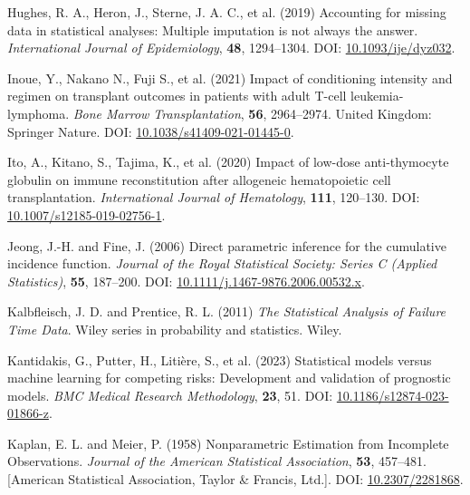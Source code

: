 \documentclass[
  letterpaper,
  paper=240mm:170mm,
  twoside=true,
  open=right,
  fontsize=10pt,
  pagesize=false,
  BCOR=15mm,
  DIV=14,
  headinclude=true,
  footinclude=false,
  headsepline=on]{scrbook}
\newlength{\cslhangindent}
\newenvironment{CSLReferences}[2] %
 {\begin{list}{}{%
  \setlength{\itemindent}{0pt}
  \setlength{\leftmargin}{0pt}
  \setlength{\parsep}{0pt}
  \ifodd #1
   \setlength{\leftmargin}{\cslhangindent}
   \setlength{\itemindent}{-1\cslhangindent}
  \fi
  \setlength{\itemsep}{#2\baselineskip}}}
 {\end{list}}
\begin{document}
\begin{CSLReferences}{1}{1}
Hughes, R. A., Heron, J., Sterne, J. A. C., et al. (2019) Accounting for
missing data in statistical analyses: Multiple imputation is not always
the answer. \emph{International Journal of Epidemiology}, \textbf{48},
1294--1304. DOI:
\href{https://doi.org/10.1093/ije/dyz032}{10.1093/ije/dyz032}.

Inoue, Y., Nakano N., Fuji S., et al. (2021) Impact of conditioning
intensity and regimen on transplant outcomes in patients with adult
{T-cell} leukemia-lymphoma. \emph{Bone Marrow Transplantation},
\textbf{56}, 2964--2974. United Kingdom: Springer Nature. DOI:
\href{https://doi.org/10.1038/s41409-021-01445-0}{10.1038/s41409-021-01445-0}.

Ito, A., Kitano, S., Tajima, K., et al. (2020) Impact of low-dose
anti-thymocyte globulin on immune reconstitution after allogeneic
hematopoietic cell transplantation. \emph{International Journal of
Hematology}, \textbf{111}, 120--130. DOI:
\href{https://doi.org/10.1007/s12185-019-02756-1}{10.1007/s12185-019-02756-1}.

Jeong, J.-H. and Fine, J. (2006) Direct parametric inference for the
cumulative incidence function. \emph{Journal of the Royal Statistical
Society: Series C (Applied Statistics)}, \textbf{55}, 187--200. DOI:
\href{https://doi.org/10.1111/j.1467-9876.2006.00532.x}{10.1111/j.1467-9876.2006.00532.x}.

Kalbfleisch, J. D. and Prentice, R. L. (2011) \emph{The Statistical
Analysis of Failure Time Data}. Wiley series in probability and
statistics. Wiley.

Kantidakis, G., Putter, H., Litière, S., et al. (2023) Statistical
models versus machine learning for competing risks: Development and
validation of prognostic models. \emph{BMC Medical Research
Methodology}, \textbf{23}, 51. DOI:
\href{https://doi.org/10.1186/s12874-023-01866-z}{10.1186/s12874-023-01866-z}.

Kaplan, E. L. and Meier, P. (1958) Nonparametric {Estimation} from
{Incomplete Observations}. \emph{Journal of the American Statistical
Association}, \textbf{53}, 457--481. {[}American Statistical
Association, Taylor \& Francis, Ltd.{]}. DOI:
\href{https://doi.org/10.2307/2281868}{10.2307/2281868}.


\end{CSLReferences}
\end{document}
